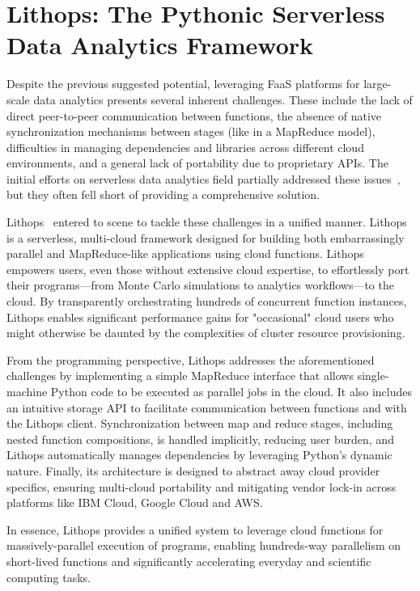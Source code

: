 \section{Lithops: The Pythonic Serverless Data Analytics Framework}
Despite the previous suggested potential, leveraging FaaS platforms for large-scale data analytics presents several inherent challenges. These include the lack of direct peer-to-peer communication between functions, the absence of native synchronization mechanisms between stages (like in a MapReduce model), difficulties in managing dependencies and libraries across different cloud environments, and a general lack of portability due to proprietary APIs. The initial efforts on serverless data analytics field partially addressed these issues~\citep{pywren}, but they often fell short of providing a comprehensive solution.

Lithops~\citep{lithops} entered to scene to tackle these challenges in a unified manner. Lithops is a serverless, multi-cloud framework designed for building both embarrassingly parallel and MapReduce-like applications using cloud functions. Lithops empowers users, even those without extensive cloud expertise, to effortlessly port their programs—from Monte Carlo simulations to analytics workflows—to the cloud. By transparently orchestrating hundreds of concurrent function instances, Lithops enables significant performance gains for "occasional" cloud users who might otherwise be daunted by the complexities of cluster resource provisioning.

From the programming perspective, Lithops addresses the aforementioned challenges by implementing a simple MapReduce interface that allows single-machine Python code to be executed as parallel jobs in the cloud. It also includes an intuitive storage API to facilitate communication between functions and with the Lithops client. Synchronization between map and reduce stages, including nested function compositions, is handled implicitly, reducing user burden, and Lithops automatically manages dependencies by leveraging Python's dynamic nature. Finally, its architecture is designed to abstract away cloud provider specifics, ensuring multi-cloud portability and mitigating vendor lock-in across platforms like IBM Cloud, Google Cloud and AWS.

In essence, Lithops provides a unified system to leverage cloud functions for massively-parallel execution of programs, enabling hundreds-way parallelism on short-lived functions and significantly accelerating everyday and scientific computing tasks.

